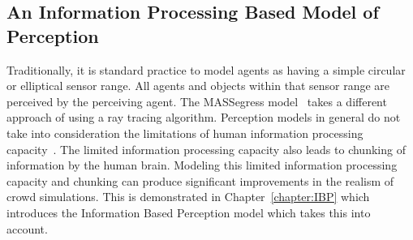 
\subsection{An Information Processing Based Model of Perception}
\label{IBEVAC:IBPModule}

Traditionally, it is standard practice to model agents as having a simple circular or elliptical sensor range. All agents and objects within that sensor range are perceived by the perceiving agent. The MASSegress model~\cite{Pan:2006vp} takes a different approach of using a ray tracing algorithm. Perception models in general do not take into consideration the limitations of human information processing capacity~\cite{Miller:1956tr}. The limited information processing capacity also leads to chunking of information by the human brain. Modeling this limited information processing capacity and chunking can produce significant improvements in the realism of crowd simulations. This is demonstrated in Chapter~\ref{chapter:IBP} which introduces the Information Based Perception model which takes this into account.



